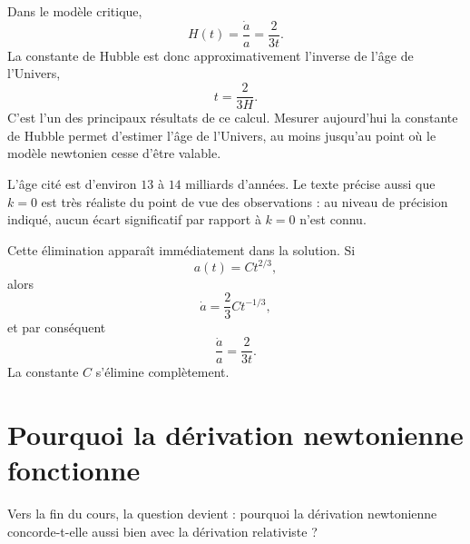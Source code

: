 Dans le modèle critique,
\begin{equation}
H(t)=\frac{\dot a}{a}=\frac{2}{3t}.
\end{equation}
La constante de Hubble est donc approximativement l’inverse de l’âge de l’Univers,
\begin{equation}
t=\frac{2}{3H}.
\end{equation}
C’est l’un des principaux résultats de ce calcul. Mesurer aujourd’hui la constante de Hubble permet d’estimer l’âge de l’Univers, au moins jusqu’au point où le modèle newtonien cesse d’être valable.

L’âge cité est d’environ \(13\) à \(14\) milliards d’années. Le texte précise aussi que \(k=0\) est très réaliste du point de vue des observations : au niveau de précision indiqué, aucun écart significatif par rapport à \(k=0\) n’est connu.

\begin{classroomqa}
\end{classroomqa}

Cette élimination apparaît immédiatement dans la solution. Si
\begin{equation}
a(t)=Ct^{2/3},
\end{equation}
alors
\begin{equation}
\dot a=\frac{2}{3}Ct^{-1/3},
\end{equation}
et par conséquent
\begin{equation}
\frac{\dot a}{a}=\frac{2}{3t}.
\end{equation}
La constante \(C\) s’élimine complètement.

\section{Pourquoi la dérivation newtonienne fonctionne}

Vers la fin du cours, la question devient : pourquoi la dérivation newtonienne concorde-t-elle aussi bien avec la dérivation relativiste ?

